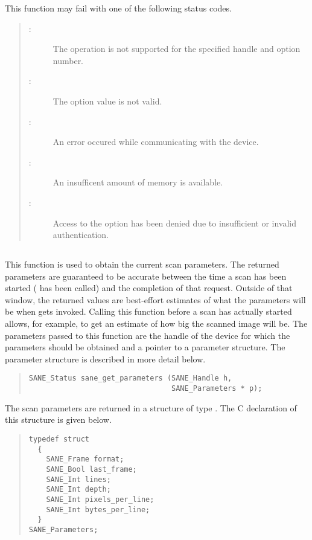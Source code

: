 \documentclass[11pt,DVIps]{report}
\begin{document}
This function may fail with one of the following status codes.
\begin{quote}
\begin{description}
\item[:] The operation is not
  supported for the specified handle and option number.
\item[:] The option value is not valid.
\item[:] An error occured while
  communicating with the device.
\item[:] An insufficent amount of memory
  is available.
\item[:] Access to the option has
  been denied due to insufficient or invalid authentication.
\end{description}
\end{quote}



\subsection{}

This function is used to obtain the current scan parameters.  The
returned parameters are guaranteed to be accurate between the time a
scan has been started ( has been called) and the
completion of that request.  Outside of that window, the returned
values are best-effort estimates of what the parameters will be when
 gets invoked.  Calling this function before a
scan has actually started allows, for example, to get an estimate of
how big the scanned image will be.  The parameters passed to this
function are the handle  of the device for which the
parameters should be obtained and a pointer  to a parameter
structure.  The parameter structure is described in more detail below.

\begin{quote}
\begin{verbatim}
SANE_Status sane_get_parameters (SANE_Handle h,
                                 SANE_Parameters * p);
\end{verbatim}
\end{quote}

The scan parameters are returned in a structure of type
.  The C declaration of this structure
is given below.
\begin{quote}
\begin{verbatim}
typedef struct
  {
    SANE_Frame format;
    SANE_Bool last_frame;
    SANE_Int lines;
    SANE_Int depth;
    SANE_Int pixels_per_line;
    SANE_Int bytes_per_line;
  }
SANE_Parameters;
\end{verbatim}
\end{quote}
\end{document}
